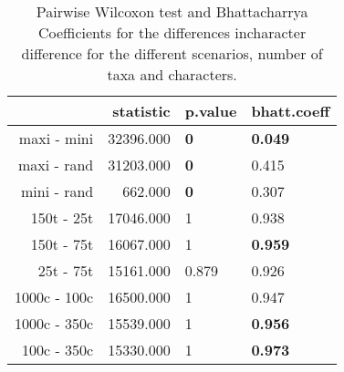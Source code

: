 \begin{table}[ht]
\centering
\begin{tabular}{rrll}
  \hline
 & statistic & p.value & bhatt.coeff \\ 
  \hline
maxi - mini & 32396.000 & \textbf{0} & \textbf{0.049} \\ 
  maxi - rand & 31203.000 & \textbf{0} & 0.415 \\ 
  mini - rand & 662.000 & \textbf{0} & 0.307 \\ 
  150t - 25t & 17046.000 & 1 & 0.938 \\ 
  150t - 75t & 16067.000 & 1 & \textbf{0.959} \\ 
  25t - 75t & 15161.000 & 0.879 & 0.926 \\ 
  1000c - 100c & 16500.000 & 1 & 0.947 \\ 
  1000c - 350c & 15539.000 & 1 & \textbf{0.956} \\ 
  100c - 350c & 15330.000 & 1 & \textbf{0.973} \\ 
   \hline
\end{tabular}
\caption{Pairwise Wilcoxon test and Bhattacharrya Coefficients for the differences incharacter difference for the different scenarios, number of taxa and characters.} 
\label{Tab_difference_change}
\end{table}
